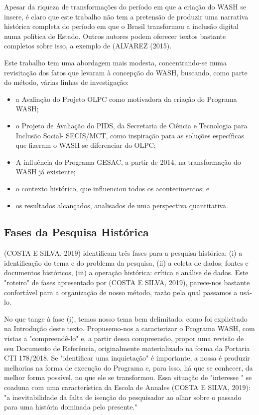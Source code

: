 Apesar da riqueza de transformações do período em que a criação do WASH se insere, é claro que este trabalho não tem a pretensão de produzir uma narrativa histórica completa do período em que o Brasil transformou a inclusão digital numa política de Estado. Outros autores podem oferecer textos bastante completos sobre isso, a exemplo de  (ALVAREZ (2015).

Este trabalho tem uma abordagem mais modesta, concentrando-se numa revisitação dos fatos que levaram à concepção do WASH, buscando, como parte do método, várias linhas de investigação:


\begin{itemize}
\item a Avaliação do Projeto OLPC como motivadora da criação do Programa WASH;
\item o Projeto de Avaliação do PIDS, da Secretaria de Ciência e Tecnologia para Inclusão Social- SECIS/MCT, como inspiração para as soluções específicas que fizeram o WASH se diferenciar do OLPC;
\item A influência do Programa GESAC, a partir de 2014, na transformação do WASH já existente;
\item o contexto histórico, que influenciou todos os acontecimentos; e
\item os resultados alcançados, analisados de uma perspectiva quantitativa.
\end{itemize}

\subsection[Fases da Pesquisa Histórica]{Fases da Pesquisa Histórica}\label{Fases da Pesquisa Histórica}
(COSTA E SILVA, 2019) identificam três fases para a pesquisa histórica: (i) a identificação do tema e do problema da pesquisa, (ii) a coleta de dados: fontes e documentos históricos, (iii) a operação histórica: crítica e análise de dados. Este "roteiro" de fases apresentado por (COSTA E SILVA, 2019), parece-nos bastante confortável para a organização de nosso método, razão pela qual passamos a usá-lo.

No que tange à fase (i), temos nosso tema bem delimitado, como foi explicitado na Introdução deste texto. Propusemo-nos a caracterizar o Programa WASH, com vistas a "compreendê-lo" e, a partir dessa compreensão, propor uma revisão de seu Documento de Referência, originalmente materializado na forma da Portaria CTI 178/2018. Se "identificar uma inquietação" é importante, a nossa é produzir melhorias na forma de execução do Programa e, para isso, há que se conhecer, da melhor forma possível, no que ele se transformou. Essa situação de "interesse " se coaduna com uma característica da Escola de Annales  (COSTA E SILVA, 2019): "a inevitabilidade da falta de isenção do pesquisador ao olhar sobre o passado para uma história dominada pelo presente."


